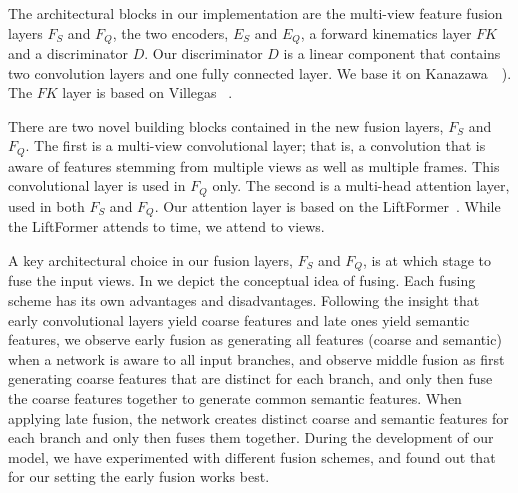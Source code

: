  \label{sec:architecture_details}






The architectural blocks in our implementation are the multi-view feature fusion layers $F_S$ and $F_Q$, the two encoders, $E_S$ and $E_Q$, a forward kinematics layer $FK$ and a discriminator $D$.
Our discriminator $D$ is a linear component that contains two convolution layers and one fully connected layer. We base it on Kanazawa~\etal~). 
The $FK$ layer is based on Villegas \etal~. 

There are two novel building blocks contained in the new fusion layers, $F_S$ and $F_Q$. The first is a multi-view convolutional layer; that is, a convolution that is aware of features stemming from  multiple views as well as multiple frames. This convolutional layer is used in $F_Q$ only.
The second is a multi-head attention layer, used in both $F_S$ and $F_Q$.
Our attention layer is based on the LiftFormer~\cite{llopart2020liftformer}. While the LiftFormer attends to time, we attend to views. 


A key architectural choice in our fusion layers, $F_S$ and $F_Q$, is at which stage to fuse the input views. In  we depict the conceptual idea of fusing. Each fusing scheme has its own advantages and disadvantages. Following the insight that early convolutional layers yield coarse features and late ones yield semantic features, we observe early fusion as generating all features (coarse and semantic) when a network is aware to all input branches, and observe middle fusion as first generating coarse features that are distinct for each branch, and only then fuse the coarse features together to generate common semantic features. When applying late fusion, the network creates distinct coarse and semantic features for each branch and only then fuses them together.
During the development of our model, we have experimented with different fusion schemes, and found out that for our setting the early fusion works best.


